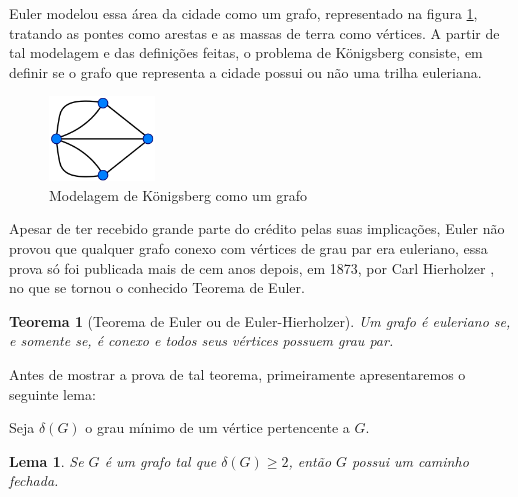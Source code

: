 \documentclass{article}
\newtheorem{theorem}{Teorema}[section]
\newtheorem{lemma}{Lema}
\begin{document}
Euler modelou essa área da cidade como um grafo, representado na figura \ref{konigsberg-graph}, tratando as pontes como arestas e as massas de terra como vértices.
A partir de tal modelagem e das definições feitas, o problema de Königsberg consiste, em definir se o grafo que representa a cidade possui ou não uma trilha euleriana. 


\begin{figure}
    \centering
    \includegraphics[width=0.25\textwidth]{konigsberg-graph.png}
    \caption{Modelagem de Königsberg como um grafo}
    \label{konigsberg-graph}
\end{figure}

Apesar de ter recebido grande parte do crédito pelas suas implicações, Euler não provou que qualquer grafo conexo com vértices de grau par era euleriano, essa prova só foi publicada mais de cem anos depois, em 1873, por Carl Hierholzer \cite{hierholzer}, no que se tornou o conhecido Teorema de Euler.


\begin{theorem}[Teorema de Euler ou de Euler-Hierholzer]
    \label{euler}
    Um grafo é euleriano se, e somente se, é conexo e todos seus vértices possuem grau par.
\end{theorem}

Antes de mostrar a prova de tal teorema, primeiramente apresentaremos o seguinte lema:

Seja $\delta(G)$ o grau mínimo de um vértice pertencente a $G$.

\begin{lemma}
	\label{lema}
	Se $G$ é um grafo tal que $\delta(G) \geq 2$, então $G$ possui um caminho fechada.
\end{lemma}
\end{document}
